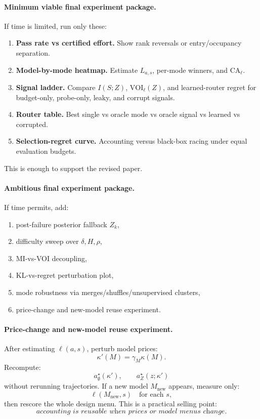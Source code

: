 \documentclass{article}
\begin{document}
\paragraph{Minimum viable final experiment package.}
If time is limited, run only these:
\begin{enumerate}[leftmargin=1.25em,itemsep=0.15em]
    \item \textbf{Pass rate vs certified effort.}
    Show rank reversals or entry/occupancy separation.
    \item \textbf{Model-by-mode heatmap.}
    Estimate \(L_{a,s}\), per-mode winners, and \(\mathrm{CA}_\ell\).
    \item \textbf{Signal ladder.}
    Compare \(I(S;Z)\), \(\mathrm{VOI}_\ell(Z)\), and learned-router regret for
    budget-only, probe-only, leaky, and corrupt signals.
    \item \textbf{Router table.}
    Best single vs oracle mode vs oracle signal vs learned vs corrupted.
    \item \textbf{Selection-regret curve.}
    Accounting versus black-box racing under equal evaluation budgets.
\end{enumerate}
This is enough to support the revised paper.

\paragraph{Ambitious final experiment package.}
If time permits, add:
\begin{enumerate}[leftmargin=1.25em,itemsep=0.15em]
    \item post-failure posterior fallback \(Z_k\),
    \item difficulty sweep over \(\delta,H,\rho\),
    \item MI-vs-VOI decoupling,
    \item KL-vs-regret perturbation plot,
    \item mode robustness via merges/shuffles/unsupervised clusters,
    \item price-change and new-model reuse experiment.
\end{enumerate}

\paragraph{Price-change and new-model reuse experiment.}
After estimating \(\ell(a,s)\), perturb model prices:
\[
    \kappa'(M)=\gamma_M\kappa(M).
\]
Recompute:
\[
    a^\star_{\emptyset}(\kappa'),
    \qquad
    a^\star_Z(z;\kappa')
\]
without rerunning trajectories.
If a new model \(M_{\mathrm{new}}\) appears, measure only:
\[
    \ell(M_{\mathrm{new}},s)
    \quad\text{for each }s,
\]
then rescore the whole design menu.
This is a practical selling point:
\[
    \textit{accounting is reusable when prices or model menus change.}
\]
\end{document}
